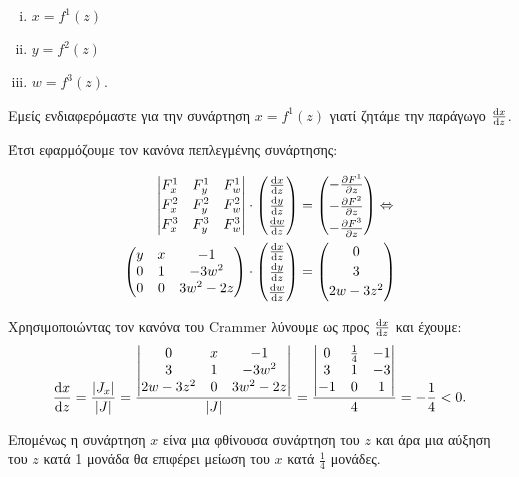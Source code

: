 \documentclass[a4paper,12pt]{article}
\begin{document}
\begin{enumerate}
\begin{enumerate}[i)]
\item $x=f^1(z)$
\item $y=f^2(z)$
\item $w=f^3(z)$.
\end{enumerate}

Εμείς ενδιαφερόμαστε για την συνάρτηση $x=f^1(z)$ γιατί ζητάμε την παράγωγο $\dv{x}{z}$.

Έτσι εφαρμόζουμε τον κανόνα πεπλεγμένης συνάρτησης:

\begin{align*}
\begin{vmatrix}
F^1_x & F^1_y & F^1_w \\[2pt]
F^2_x & F^2_y & F^2_w \\[2pt]
F^3_x & F^3_y & F^3_w
\end{vmatrix}\cdot 
\begin{pmatrix}
\dv{x}{z} \\[2pt]
\dv{y}{z} \\[2pt]
\dv{w}{z}
\end{pmatrix}&=\begin{pmatrix}
-\pdv{F^1}{z} \\[2pt]
-\pdv{F^2}{z} \\[2pt]
-\pdv{F^3}{z}
\end{pmatrix}\Leftrightarrow \\
\begin{pmatrix}
y & x & -1 \\
0 & 1 & -3w^2 \\
0 & 0 & 3w^2-2z
\end{pmatrix}\cdot \begin{pmatrix}
\dv{x}{z} \\[2pt]
\dv{y}{z} \\[2pt]
\dv{w}{z}
\end{pmatrix} &= \begin{pmatrix}
0 \\[2pt]
3\\[2pt]
2w-3z^2
\end{pmatrix}
\end{align*}

Χρησιμοποιώντας τον κανόνα του \textlatin{Crammer} λύνουμε ως προς $\dv{x}{z}$ και έχουμε:
\[
\dv{x}{z}=\frac{|J_x|}{|J|}=\frac{\begin{vmatrix}
0 & x & -1 \\
3 & 1 & -3w^2 \\
2w-3z^2 & 0 & 3w^2-2z 
\end{vmatrix}}{|J|}=\frac{\begin{vmatrix}
0 & \frac{1}{4} & -1 \\
3 & 1 & -3 \\
-1 & 0 & 1
\end{vmatrix}}{4}=-\frac{1}{4}<0.
\]

Επομένως η συνάρτηση $x$ είνα μια φθίνουσα συνάρτηση του $z$ και άρα μια αύξηση του $z$ κατά 1 μονάδα θα επιφέρει μείωση του $x$ κατά $\frac{1}{4}$ μονάδες.

\end{enumerate}
\end{document}
